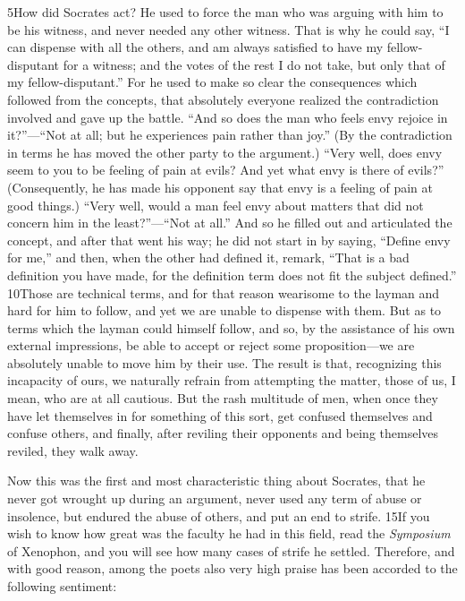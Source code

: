 5How did Socrates act? He used to force the man who was arguing with him to be his witness, and never needed any other witness. That is why he could say, ``I can dispense with all the others, and am always satisfied to have my fellow-disputant for a witness; and the votes of the rest I do not take, but only that of my fellow-disputant.'' For he used to make so clear the consequences which followed from the concepts, that absolutely everyone realized the contradiction involved and gave up the battle. ``And so does the man who feels envy rejoice in it?''—``Not at all; but he experiences pain rather than joy.'' (By the contradiction in terms he has moved the other party to the argument.) ``Very well, does envy seem to you to be feeling of pain at evils? And yet what envy is there of evils?'' (Consequently, he has made his opponent say that envy is a feeling of pain at good things.) ``Very well, would a man feel envy about matters that did not concern him in the least?''—``Not at all.'' And so he filled out and articulated the concept, and after that went his way; he did not start in by saying, ``Define envy for me,'' and then, when the other had defined it, remark, ``That is a bad definition you have made, for the definition term does not fit the subject defined.'' 10Those are technical terms, and for that reason wearisome to the layman and hard for him to follow, and yet we are unable to dispense with them. But as to terms which the layman could himself follow, and so, by the assistance of his own external impressions, be able to accept or reject some proposition—we are absolutely unable to move him by their use. The result is that, recognizing this incapacity of ours, we naturally refrain from attempting the matter, those of us, I mean, who are at all cautious. But the rash multitude of men, when once they have let themselves in for something of this sort, get confused themselves and confuse others, and finally, after reviling their opponents and being themselves reviled, they walk away.

Now this was the first and most characteristic thing about Socrates, that he never got wrought up during an argument, never used any term of abuse or insolence, but endured the abuse of others, and put an end to strife. 15If you wish to know how great was the faculty he had in this field, read the \emph{Symposium} of Xenophon, and you will see how many cases of strife he settled. Therefore, and with good reason, among the poets also very high praise has been accorded to the following sentiment:

